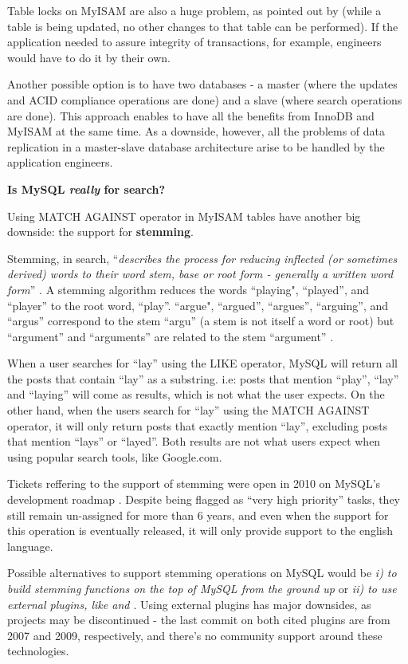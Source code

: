 Table locks on MyISAM are also a huge problem, as pointed out by \cite{scoutmigration} (while a table is being updated, no other changes to that table can be performed). If the application needed to assure integrity of transactions, for example, engineers would have to do it by their own.

Another possible option is to have two databases - a master (where the updates and ACID compliance operations are done) and a slave (where search operations are done). This approach enables to have all the benefits from InnoDB and MyISAM at the same time. As a downside, however, all the problems of data replication in a master-slave database architecture arise to be handled by the application engineers. 


\noindent \textbf{Is MySQL \textit{really} for search?}

Using MATCH AGAINST operator in MyISAM tables have another big downside: the support for \textbf{stemming}.

Stemming, in search, ``\textit{describes the process for reducing inflected (or sometimes derived) words to their word stem, base or root form - generally a written word form}'' \cite{stemming}. A stemming algorithm reduces the words ``playing", ``played'', and ``player'' to the root word, ``play''. ``argue", ``argued'', ``argues'', ``arguing'', and ``argus'' correspond to the stem ``argu'' (a stem is not itself a word or root) but ``argument'' and ``arguments'' are related to the stem ``argument'' \cite{stemming}.

When a user searches for ``lay'' using the LIKE operator, MySQL will return all the posts that contain ``lay'' as a substring. i.e: posts that mention ``play'', ``lay'' and ``laying'' will come as results, which is not what the user expects. On the other hand, when the users search for ``lay'' using the MATCH AGAINST operator, it will only return posts that exactly mention ``lay'', excluding posts that mention ``lays'' or ``layed''. Both results are not what users expect when using popular search tools, like Google.com.

Tickets reffering to the support of stemming were open in 2010 on MySQL's development roadmap \cite{dictionarymysql} \cite{stemmingmysql}. Despite being flagged as ``very high priority'' tasks, they still remain un-assigned for more than 6 years, and even when the support for this operation is eventually released, it will only provide support to the english language. 

Possible alternatives to support stemming operations on MySQL would be \textit{i) to build stemming functions on the top of MySQL from the ground up} or \textit{ii) to use external plugins, like \cite{udmstemmer} and \cite{udfstemmer}}. Using external plugins has major downsides, as projects may be discontinued - the last commit on both cited plugins are from 2007 and 2009, respectively, and there's no community support around these technologies. 

